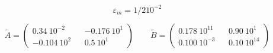 \[ \varepsilon_m=1/2 10^{-2} \]

\medskip
\[
 \widetilde A=\left(
\begin{array}{ccc}
0.34\ 10^{-2} && -0.176\ 10^1 \\
-0.104\ 10^{2} && 0.5\ 10^{1}
\end{array} \right) \quad \quad
 \widetilde B=\left(
\begin{array}{ccc}
0.178\ 10^{11} & & 0.90\ 10^1 \\
0.100\ 10^{-3} &  & 0.10\ 10^{14}
\end{array}
\right)
\]
